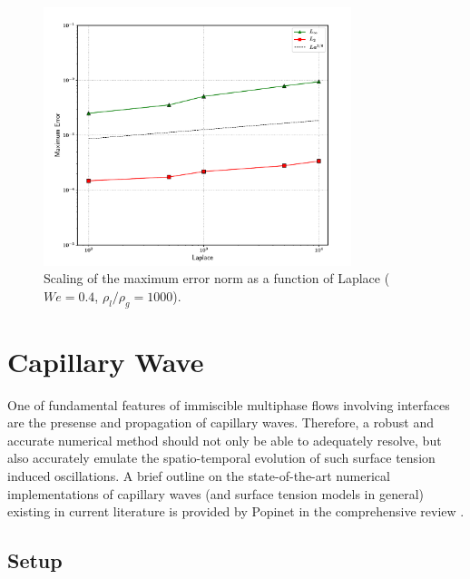 \begin{figure}
    \centering
    \includegraphics[width = 0.8\textwidth]{plots/droplet_advect/laplaces.pdf}
\caption{ Scaling of the maximum error norm as a function of Laplace ($We = 0.4$, $\rho_l / \rho_g = 1000$). }
    \label{lap}
\end{figure}




\section{Capillary Wave}
One of fundamental features of immiscible multiphase flows involving interfaces are the presense and propagation of capillary waves. Therefore, a robust and accurate numerical method should not only be able to adequately resolve, but also accurately emulate the spatio-temporal evolution of such surface tension induced oscillations. A brief outline on the state-of-the-art numerical implementations of capillary waves (and surface tension models in general) existing in current literature is provided by Popinet in the comprehensive review .

\subsection*{Setup}


